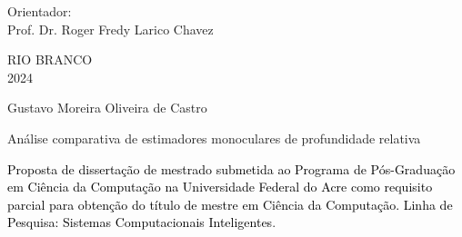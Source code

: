 	\vskip1.50cm
	  \begin{center}
	    \small Orientador: \\
	    Prof. Dr. {Roger Fredy Larico Chavez}\vskip3.5cm 
	  \end{center}
	  \begin{center}
	    \vspace{4mm}
	    RIO BRANCO \\
	    2024
	  \end{center}
	
	\thispagestyle{empty}
	\cleardoublepage
	\thispagestyle{empty}
	
	\vspace{-60mm}
	
	\begin{center}
	  {\large Gustavo Moreira Oliveira de Castro} \\
	  \vspace{7mm}
	
	  {\large Análise comparativa de estimadores monoculares de profundidade relativa} \\
	  \vspace{10mm}
	\end{center}
	
	\noindent
	\begin{flushright}
	  \begin{minipage}[t]{8cm}
	
		\textcolor{black}{Proposta de dissertação de mestrado submetida ao Programa de Pós-Graduação em Ciência da Computação na Universidade Federal do Acre como requisito parcial para obtenção do título de mestre em Ciência da Computação. Linha de Pesquisa: Sistemas Computacionais Inteligentes}.
	
	  \end{minipage}
	\end{flushright}
	
	\vspace{1.0 cm}
	\noindent
	

